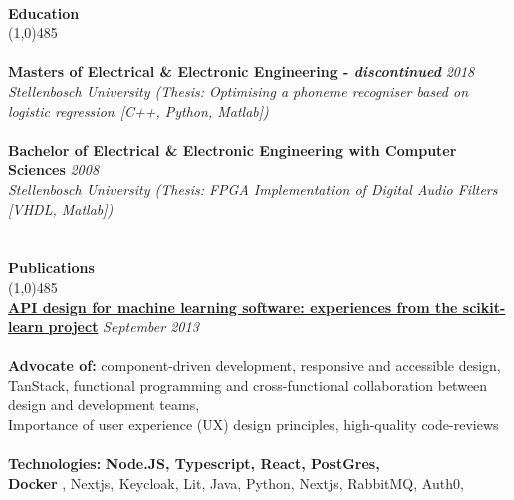 \documentclass[9pt]{extarticle}
\newcommand\tab[1][1cm]{\hspace*{#1}}
\newcommand\smallspace[1][0.23cm]{\hspace*{#1}}
\newcommand\negativespace[1][-0.12cm]{\hspace*{#1}}
\begin{document}
\noindent %
\\
\vspace*{-6pt}
{\negativespace \Large \bf Education}\\
\line(1,0){485}\\
\\
\noindent
{\bf Masters of Electrical & Electronic Engineering - \textit{discontinued}} \hfill \textit{2018} \\
\textit{Stellenbosch University (Thesis: Optimising a phoneme recogniser based on logistic regression [C++, Python, Matlab])} \\\\
\noindent
{\bf Bachelor of Electrical & Electronic Engineering with Computer Sciences} \hfill \textit{2008} \\
\textit{Stellenbosch University (Thesis: FPGA Implementation of Digital Audio Filters [VHDL, Matlab])} \\
\\
\\
\vspace*{-6pt}
{\negativespace \Large \bf Publications}\\
\line(1,0){485}\\
{\bf \href{https://paperswithcode.com/paper/api-design-for-machine-learning-software}{API design for machine learning software: experiences from the scikit-learn project}} \hfill \textit{September 2013} \\
\\

\noindent
{\bf Advocate of:} component-driven development, responsive and accessible design, TanStack, functional programming and
\tab \tab cross-functional collaboration between design and development teams,\\
\tab \tab Importance of user experience (UX) design principles, high-quality code-reviews\\ \\
\noindent
{\bf Technologies:} \textbf{Node.JS, Typescript, React, PostGres, \\
\tab \tab \smallspace  Docker }, Nextjs, Keycloak, Lit, Java, Python, Nextjs, RabbitMQ, Auth0, \\
\end{document}
